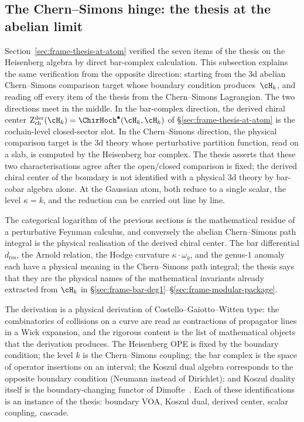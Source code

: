 \subsection{The Chern--Simons hinge: the thesis at the abelian limit}
\label{sec:cs-hinge-heisenberg}

Section~\ref{sec:frame-thesis-at-atom} verified the seven items of
the thesis on the Heisenberg algebra by direct bar-complex
calculation. This subsection explains the same verification from
the opposite direction: starting from the 3d abelian Chern--Simons
comparison target whose boundary condition produces~$\cH_k$, and reading off
every item of the thesis from the Chern--Simons Lagrangian. The
two directions meet in the middle. In the bar-complex direction,
the derived chiral center
$\mathrm{Z}^{\mathrm{der}}_{\mathrm{ch}}(\cH_k)
= \ChirHoch^{\bullet}(\cH_k, \cH_k)$ of
\S\ref{sec:frame-thesis-at-atom} is the cochain-level closed-sector
slot. In the Chern--Simons direction, the physical comparison target
is the 3d theory whose perturbative partition function, read on a
slab, is computed by the Heisenberg bar complex. The thesis asserts
that these two characterisations agree after the open/closed
comparison is fixed; the derived chiral center of the boundary is not
identified with a physical 3d theory by bar-cobar algebra alone.
At the Gaussian atom, both reduce to a single scalar, the level
$\kappa = k$, and the reduction can be carried out line by line.

The categorical logarithm of the previous sections is the
mathematical residue of a perturbative Feynman calculus, and
conversely the abelian Chern--Simons path integral is the
physical realisation of the derived chiral center. The bar
differential $d_{\mathrm{res}}$, the Arnold relation, the Hodge
curvature $\kappa\cdot\omega_g$, and the genus-$1$ anomaly each
have a physical meaning in the Chern--Simons path integral; the
thesis says that they are the physical names of the mathematical
invariants already extracted from $\cH_k$ in
\S\ref{sec:frame-bar-deg1}--\S\ref{sec:frame-modular-package}.

The derivation is a physical derivation of Costello--Gaiotto--Witten
type: the combinatorics of collisions on a curve are read as
contractions of propagator lines in a Wick expansion, and the
rigorous content is the list of mathematical objects that the
derivation produces. The Heisenberg OPE is fixed by the boundary
condition; the level $k$ is the Chern--Simons coupling; the bar
complex is the space of operator insertions on an interval;
the Koszul dual algebra corresponds to the opposite boundary
condition (Neumann instead of Dirichlet); and Koszul duality
itself is the boundary-changing functor of
Dimofte~\cite{CostelloGaiotto2020}. Each of these identifications
is an instance of the thesis: boundary VOA, Koszul dual, derived
center, scalar coupling, cascade.

